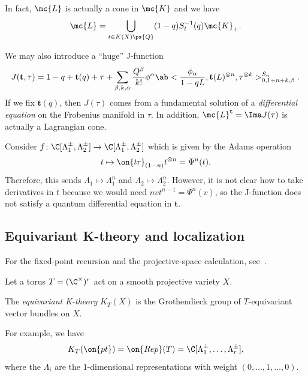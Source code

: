 \begin{prop}
    In fact, \(\mc{L}\) is actually a cone in \(\mc{K}\) and we have
    \[ \mc{L} = \bigcup_{t \in K(X)\ps{Q}} (1-q) S_{t}^{-1}(q) \mc{K}_+. \]
\end{prop}

We may also introduce a ``huge'' J-function
\[ J(\mathbf{t}, \tau) = 1-q + \mathbf{t}(q) + \tau + \sum_{\beta, k, \alpha} \frac{Q^{\beta}}{k!} \phi^{\alpha} \ab< \frac{\phi_{\alpha}}{1-qL}, \mathbf{t}(L)^{\otimes n}, \tau^{\otimes k}>_{0,1+n+k,\beta}^{S_n}. \]
If we fix \(\mathbf{t}(q)\), then \(J(\tau)\) comes from a fundamental solution of a \textit{differential equation} on the Frobenius manifold in \(\tau\). In addition, \(\mc{L}^{\mathbf{t}}=  \Ima J(\tau)\) is actually a Lagrangian cone.

\begin{exm}
    Consider \(f \colon \C[\Lambda_1^{\pm}, \Lambda_2^{\pm}] \to \C[\Lambda_1^{\pm}, \Lambda_2^{\pm}]\) which is given by the Adams operation
    \[ t \mapsto \on{tr}_{(1\cdots n)} t^{\otimes n} = \Psi^n (t). \]
    Therefore, this sends \(\Lambda_1 \mapsto \Lambda_1^n\) and \(\Lambda_2 \mapsto \Lambda_2^n\). However, it is not clear how to take derivatives in \(t\) because we would need \(nv t^{n-1} = \Psi^n(v)\), so the J-function does not satisfy a quantum differential equation in \(\mathbf{t}\).
\end{exm}

\subsection{Equivariant K-theory and localization}%
\label{sub:Equivariant K-theory and localization}

For the fixed-point recursion and the projective-space calculation, see~\cite{GiventalK2}.

Let a torus \(T = (\C^{\times})^r\) act on a smooth projective variety \(X\).

\begin{defn}
    The \textit{equivariant K-theory} \(K_T(X)\) is the Grothendieck group of \(T\)-equivariant vector bundles on \(X\).
\end{defn}

\begin{exm}
    For example, we have
    \[ K_T(\on{pt}) = \on{Rep}(T) = \C[\Lambda_1^{\pm}, \ldots, \Lambda_r^{\pm}], \]
    where the \(\Lambda_i\) are the \(1\)-dimensional representations with weight \((0, \ldots, 1, \ldots, 0)\).
\end{exm}

